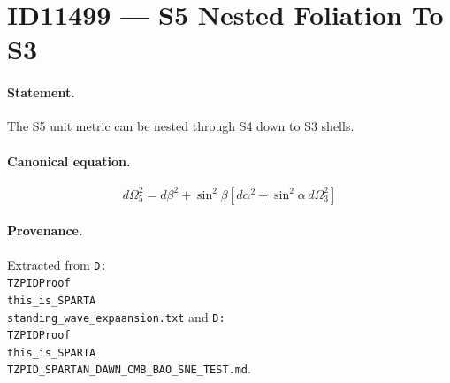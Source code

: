 \section*{ID11499 --- S5 Nested Foliation To S3}

\paragraph{Statement.}
The S5 unit metric can be nested through S4 down to S3 shells.

\paragraph{Canonical equation.}
\[
d\Omega_5^2=d\beta^2+\sin^2\beta\left[d\alpha^2+\sin^2\alpha\,d\Omega_3^2\right]
\]

\paragraph{Provenance.}
Extracted from \texttt{D:\\TZPIDProof\\this\_is\_SPARTA\\standing\_wave\_expaansion.txt} and \texttt{D:\\TZPIDProof\\this\_is\_SPARTA\\TZPID\_SPARTAN\_DAWN\_CMB\_BAO\_SNE\_TEST.md}.
